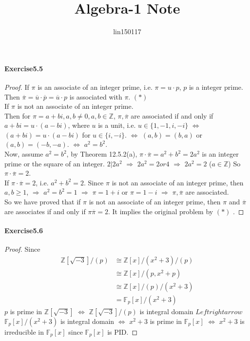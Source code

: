 \documentclass{article}
\title{Algebra-1 Note}
\author{lin150117 }
\date{}
\begin{document}
\setlength{\parindent}{0pt}
\paragraph*{Exercise5.5}
\begin{proof}
    If  $ \pi  $ is an associate of an integer prime, i.e.  $ \pi=u\cdot p $,  $ p  $ is a integer prime. Then  $ \overline{\pi}=\overline{u}\cdot \overline{p}=\overline{u}\cdot p $ is associated with  $ \pi $. $ (\ast) $ \\
    If  $ \pi  $ is not an associate of an integer prime. \\Then for  $ \pi=a+bi,a,b\not=0,a,b\in \mathbb{Z} $,  $ \pi,\overline{\pi } $ are associated if and only if  $ a+bi=u\cdot(a-bi)$, where  $ u  $ is a unit, i.e.  $ u\in\{1,-1,i,-i\} $  $ \Leftrightarrow  $  $ (a+bi)=u\cdot(a-bi) $ for  $ u\in\{i,-i\} $. $ \Leftrightarrow $  $ (a,b)=(b,a) $ or $ (a,b)=(-b,-a) $.  $ \Leftrightarrow  $  $ a^2=b^2 $. \\
    Now, assume  $ a^2=b^2 $, by Theorem 12.5.2(a),  $ \pi\cdot \overline{\pi}=a^2+b^2=2a^2 $ is an integer prime or the square of an integer. $ 2|2a^2 $ $ \Rightarrow  $  $ 2a^2=2 or 4 $  $ \Rightarrow  $  $ 2a^2=2 $ ($a\in\mathbb{Z} $) So  $ \pi\cdot\overline{\pi}=2 $.\\
    If  $ \pi\cdot\overline{\pi}=2 $, i.e.  $ a^2+b^2=2 $. Since  $ \pi  $ is not an associate of an integer prime, then  $ a,b \geq 1 $,  $ \Rightarrow  $  $ a^2=b^2=1 $  $ \Rightarrow  $  $ \pi=1+i  $ or  $ \pi=1-i $  $ \Rightarrow  $  $ \pi,\overline{\pi } $ are associated.\\
    So we have proved that if  $ \pi  $ is not an associate of an integer prime, then  $ \pi  $ and  $ \overline{\pi } $ are associates if and only if  $ \pi\overline{\pi}=2 $. It implies the original problem by  $ (\ast) $ .
\end{proof}
\paragraph{Exercise5.6}
\begin{proof}
    Since  
    \begin{align}
        \mathbb{Z}[\sqrt{-3}]/(p)&\cong\mathbb{Z}[x]/(x^2+3)/(p)\\
        &\cong\mathbb{Z}[x]/(p,x^2+p)\\
        &\cong \mathbb{Z}[x]/(p)/(x^2+3)\\
        &=\mathbb{F}_p[x]/(x^2+3)
    \end{align}
     $ p  $ is prime in  $ \mathbb{Z}[\sqrt{-3}] $ $ \Leftrightarrow  $  $ \mathbb{Z}[\sqrt{-3}]/(p) $ is integral domain  $ Leftrightarrow  $  $ \mathbb{F}_p[x]/(x^2+3) $ is integral domain  $ \Leftrightarrow $  $ x^2+3 $ is prime in  $ \mathbb{F}_p[x] $ $ \Leftrightarrow $  $ x^2+3 $ is irreducible in  $ \mathbb{F}_p[x] $ since  $ \mathbb{F}_p[x] $ is PID.
\end{proof}
\end{document}
